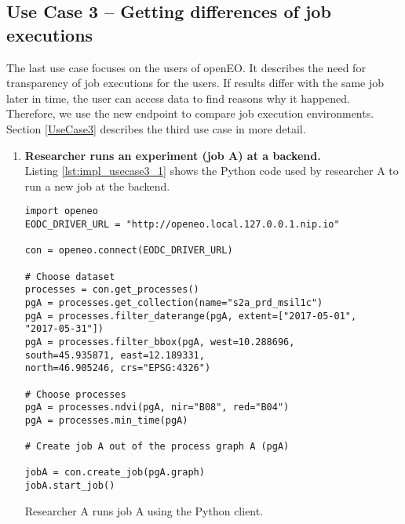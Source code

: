 \documentclass[draft,final]{vutinfth} %
\newenvironment{code}{\captionsetup{type=listing}}{}
\begin{document}
\subsection{Use Case 3 – Getting differences of job executions}\label{Implementation:Use Case3}
The last use case focuses on the users of openEO. It describes the need for transparency of job executions for the users. If results differ with the same job later in time, the user can access data to find reasons why it happened. Therefore, we use the new endpoint to compare job execution environments. Section \ref{UseCase3} describes the third use case in more detail.  
\begin{enumerate}
	\item \textbf{Researcher runs an experiment (job A) at a backend.}\\
	Listing \ref{lst:impl_usecase3_1} shows the Python code used by researcher A to run a new job at the backend. 

\begin{code}
	\begin{verbatim}
import openeo
EODC_DRIVER_URL = "http://openeo.local.127.0.0.1.nip.io"

con = openeo.connect(EODC_DRIVER_URL)

# Choose dataset
processes = con.get_processes()
pgA = processes.get_collection(name="s2a_prd_msil1c")
pgA = processes.filter_daterange(pgA, extent=["2017-05-01", 
"2017-05-31"])
pgA = processes.filter_bbox(pgA, west=10.288696, 
south=45.935871, east=12.189331, 
north=46.905246, crs="EPSG:4326")

# Choose processes
pgA = processes.ndvi(pgA, nir="B08", red="B04")
pgA = processes.min_time(pgA)

# Create job A out of the process graph A (pgA)

jobA = con.create_job(pgA.graph)
jobA.start_job()
	\end{verbatim}
	\caption{Researcher A runs job A using the Python client.}
	\label{lst:impl_usecase3_1}
\end{code}


\end{enumerate}
\end{document}
